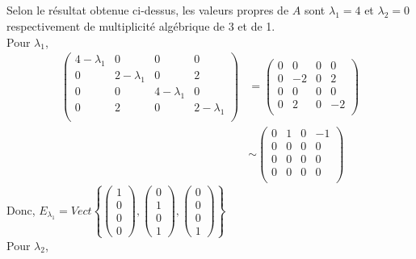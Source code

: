 \subsection{}
Selon le résultat obtenue ci-dessus, les valeurs propres de $A$ sont $\lambda_1=4$ et $\lambda_2=0$ respectivement de multiplicité algébrique de 3 et de 1. \\
Pour $\lambda_1$,
\[\begin{split}
\left(
\begin{array}{cccc}
4-\lambda _1 & 0 & 0 & 0 \\
0 & 2-\lambda _1 & 0 & 2 \\
0 & 0 & 4-\lambda _1 & 0 \\
0 & 2 & 0 & 2-\lambda _1 \\
\end{array}
\right)&=\left(
\begin{array}{cccc}
0 & 0 & 0 & 0 \\
0 & -2 & 0 & 2 \\
0 & 0 & 0 & 0 \\
0 & 2 & 0 & -2 \\
\end{array}
\right)\\
&\sim \left(
\begin{array}{cccc}
0 & 1 & 0 & -1 \\
0 & 0 & 0 & 0 \\
0 & 0 & 0 & 0 \\
0 & 0 & 0 & 0 \\
\end{array}
\right)
\end{split}\]
Donc,
$E_{\lambda_1}=Vect\left\{\begin{pmatrix}
1\\0\\0\\0
\end{pmatrix},\begin{pmatrix}
0\\1\\0\\1
\end{pmatrix},\begin{pmatrix}
0\\0\\0\\1
\end{pmatrix}\right\}$
\\
Pour $\lambda_2$,
